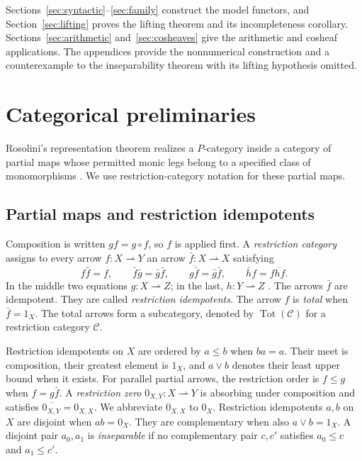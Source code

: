 \documentclass[11pt]{article}
\begin{document}
Sections~\ref{sec:syntactic}--\ref{sec:family} construct the model
functors, and Section~\ref{sec:lifting} proves the lifting theorem and
its incompleteness corollary. Sections~\ref{sec:arithmetic}
and~\ref{sec:cosheaves} give the arithmetic and cosheaf applications.
The appendices provide the nonnumerical construction and a counterexample
to the inseparability theorem with its lifting hypothesis omitted.

\section{Categorical preliminaries}\label{sec:preliminaries}

Rosolini's representation theorem realizes a $P$-category inside a
category of partial maps whose permitted monic legs belong to a
specified class of monomorphisms \cite[Theorem 1.2]{Rosolini}.
We use restriction-category notation for these partial maps.

\subsection{Partial maps and restriction idempotents}

Composition is written $gf=g\circ f$, so $f$ is applied first.
A \emph{restriction category} assigns to every arrow
$f:X\rightharpoonup Y$ an arrow
$\bar f:X\rightharpoonup X$ satisfying
\[
 f\bar f=f,\qquad
 \bar f\bar g=\bar g\bar f,\qquad
 \overline{g\bar f}=\bar g\bar f,\qquad
 \bar h f=f\overline{hf}.
\]
In the middle two equations $g:X\rightharpoonup Z$; in the last,
$h:Y\rightharpoonup Z$ \cite{CockettLack}.
The arrows $\bar f$ are idempotent. They are called
\emph{restriction idempotents}.
The arrow $f$ is \emph{total} when $\bar f=1_X$.
The total arrows form a subcategory, denoted by
$\operatorname{Tot}(\mathcal C)$ for a restriction category $\mathcal C$.

Restriction idempotents on $X$ are ordered by $a\le b$ when $ba=a$.
Their meet is composition, their greatest element is $1_X$, and
$a\vee b$ denotes their least upper bound when it exists.
For parallel partial arrows, the restriction order is
$f\le g$ when $f=g\bar f$.
A \emph{restriction zero} $0_{X,Y}:X\rightharpoonup Y$ is
absorbing under composition and satisfies
$\overline{0_{X,Y}}=0_{X,X}$. We abbreviate $0_{X,X}$ to $0_X$.
Restriction idempotents $a,b$ on $X$ are disjoint when $ab=0_X$.
They are complementary when also $a\vee b=1_X$.
A disjoint pair $a_0,a_1$ is \emph{inseparable} if no complementary
pair $c,c'$ satisfies $a_0\le c$ and $a_1\le c'$.
\end{document}
